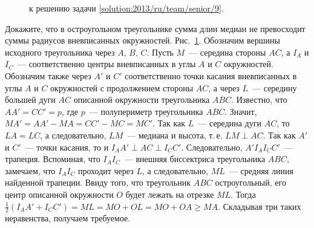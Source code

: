 \ifsolution
\begin{figure}[bt]\centering
    \caption{к решению задачи \ref{solution:2013/ru/team/senior/9}.}
    \label{fig:solution:2013/ru/team/senior/9}
\end{figure}%
\fi %

\problem{}
Докажите, что в остроугольном треугольнике сумма длин медиан не превосходит
суммы радиусов вневписанных окружностей.
\solution
\label{solution:2013/ru/team/senior/9}
Рис.~\ref{fig:solution:2013/ru/team/senior/9}.
Обозначим вершины исходного треугольника через $A$, $B$, $C$.
Пусть $M$~--- середина стороны $AC$, а $I_A$ и $I_C$~--- соответственно центры
вневписанных в углы $A$ и $C$ окружностей.
Обозначим также через $A'$ и $C'$ соответственно точки касания вневписанных в
углы $A$ и $C$ окружностей с продолжением стороны $AC$, а через $L$~---
середину большей дуги $AC$ описанной окружности треугольника $ABC$.
Известно, что $AA' = CC' = p$, где $p$~--- полупериметр треугольника $ABC$.
Значит, $MA' = AA' - MA = CC' - MC = MC'$.
Так как $L$~--- середина дуги $AC$, то $LA = LC$, а следовательно, $LM$~---
медиана и высота, т.\,е. $LM \perp AC$.
Так как $A'$ и $C'$~--- точки касания, то и $I_A A' \perp AC \perp I_C C'$.
Следовательно, $A' I_A I_C C'$~--- трапеция.
Вспоминая, что $I_A I_C$~--- внешняя биссектриса треугольника $ABC$, замечаем,
что $I_A I_C$ проходит через $L$, а следовательно, $ML$~--- средняя линия
найденной трапеции.
Ввиду того, что треугольник $ABC$ остроугольный, его центр описанной окружности
$O$ будет лежать на отрезке $ML$.
Тогда $\frac{1}{2} (I_A A' + I_C C') = ML = MO + OL = MO + OA \geq MA$.
Складывая три таких неравенства, получаем требуемое.
\endproblem
